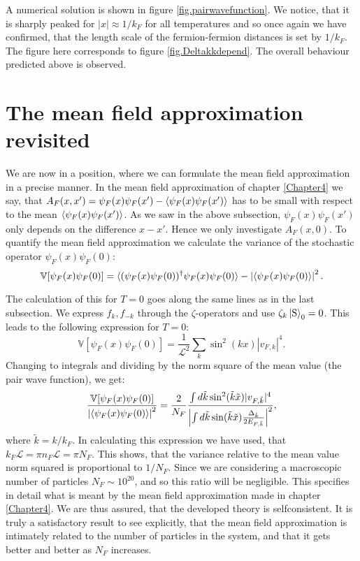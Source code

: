 A numerical solution is shown in figure \ref{fig.pairwavefunction}. We notice, that it is sharply peaked for $|x| \approx 1/k_F$ for all temperatures and so once again we have confirmed, that the length scale of the fermion-fermion distances is set by $1/k_F$. The figure here corresponds to figure \ref{fig.Deltakkdepend}. The overall behaviour predicted above is observed. 

\section{The mean field approximation revisited}
We are now in a position, where we can formulate the mean field approximation in a precise manner. In the mean field approximation of chapter \ref{Chapter4} we say, that $A_F(x,x') = \psi_F(x)\psi_F(x') - \braket{\psi_F(x)\psi_F(x')}$ has to be small with respect to the mean $\braket{\psi_F(x)\psi_F(x')}$. As we saw in the above subsection, $\psi_F(x)\psi_F(x')$ only depends on the difference $x-x'$. Hence we only investigate $A_F(x,0)$. 
To quantify the mean field approximation we calculate the variance of the stochastic operator $\psi_F(x)\psi_F(0)$:
\begin{equation}
\mathbb{V}[\psi_F(x)\psi_F(0)] = \braket{(\psi_F(x)\psi_F(0))^\dagger \psi_F(x)\psi_F(0)} - \left|\braket{\psi_F(x)\psi_F(0)}\right|^2. \nonumber  
\end{equation}

The calculation of this for $T = 0$ goes along the same lines as in the last subsection. We express $f_k, f_{-k}$ through the $\zeta$-operators and use $\zeta_k \ket{\text{S}}_0 = 0$. This leads to the following expression for $T = 0$:
\begin{equation}
\mathbb{V}[\psi_F(x)\psi_F(0)] = \frac{1}{\mathcal{L}^2}\sum_k \sin^2(kx)|v_{F,k}|^4. \nonumber
\end{equation}
Changing to integrals and dividing by the norm square of the mean value (the pair wave function), we get:
\begin{equation}
\frac{\mathbb{V} [\psi_F(x)\psi_F(0)] }{\left|\braket{\psi_F(x)\psi_F(0)}\right|^2} = \frac{2}{N_F}\frac{\int d\tilde{k} \sin^2(\tilde{k}\tilde{x})|v_{F,\tilde{k}}|^4}{\left| \int d\tilde{k} \sin( \tilde{k}\tilde{x} )\frac{ \Delta_{\tilde{k}} }{ 2E_{F,\tilde{k}} } \right|^2 },
\label{eq.RelativeVarianceSupefluidField}
\end{equation}
where $\tilde{k} = k/k_F$. In calculating this expression we have used, that $k_F \mathcal{L} = \pi n_F \mathcal{L} = \pi N_F$. This shows, that the variance relative to the mean value norm squared is proportional to $1/N_F$. Since we are considering a macroscopic number of particles $N_F \sim 10^{20}$, and so this ratio will be negligible. This specifies in detail what is meant by the mean field approximation made in chapter \ref{Chapter4}. We are thus assured, that the developed theory is selfconsistent. It is truly a satisfactory result to see explicitly, that the mean field approximation is intimately related to the number of particles in the system, and that it gets better and better as $N_F$ increases.  



